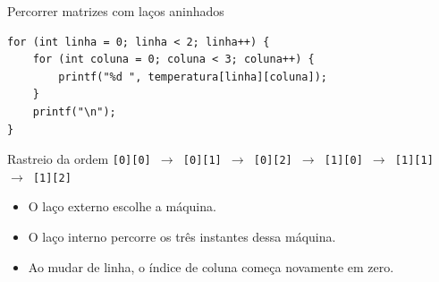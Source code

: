 \begin{frame}[fragile]{Percorrer matrizes com laços aninhados}
\begin{lstlisting}
for (int linha = 0; linha < 2; linha++) {
    for (int coluna = 0; coluna < 3; coluna++) {
        printf("%d ", temperatura[linha][coluna]);
    }
    printf("\n");
}
\end{lstlisting}
\begin{block}{Rastreio da ordem}
\texttt{[0][0] $\to$ [0][1] $\to$ [0][2] $\to$ [1][0] $\to$ [1][1] $\to$ [1][2]}
\end{block}
\begin{itemize}
\item O laço externo escolhe a máquina.
\item O laço interno percorre os três instantes dessa máquina.
\item Ao mudar de linha, o índice de coluna começa novamente em zero.
\end{itemize}
\end{frame}
